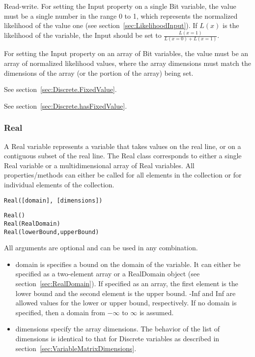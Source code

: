 Read-write.  For setting the Input property on a single Bit variable, the value must be a single number in the range 0 to 1, which represents the normalized likelihood of the value one (see section~\ref{sec:LikelihoodInput}).  If $L(x)$ is the likelihood of the variable, the Input should be set to $\frac{L(x=1)}{L(x=0) + L(x=1)}$.

For setting the Input property on an array of Bit variables, the value must be an array of normalized likelihood values, where the array dimensions must match the dimensions of the array (or the portion of the array) being set.



See section~\ref{sec:Discrete.FixedValue}.



See section~\ref{sec:Discrete.hasFixedValue}.


\subsubsection{Real}

A Real variable represents a variable that takes values on the real line, or on a contiguous subset of the real line.  \ifmatlab The Real class corresponds to either a single Real variable or a multidimensional array of Real variables.  All properties/methods can either be called for all elements in the collection or for individual elements of the collection.  \fi


\ifmatlab
\begin{lstlisting}
Real([domain], [dimensions])
\end{lstlisting}
\fi

\ifjava
\begin{lstlisting}
Real()
Real(RealDomain)
Real(lowerBound,upperBound)
\end{lstlisting}
\fi

\ifmatlab
All arguments are optional and can be used in any combination.

\begin{itemize}
\item domain is specifies a bound on the domain of the variable. It can either be specified as a two-element array or a RealDomain object (see section~\ref{sec:RealDomain}).  If specified as an array, the first element is the lower bound and the second element is the upper bound. -Inf and Inf are allowed values for the lower or upper bound, respectively.  If no domain is specified, then a domain from $-\infty$ to $\infty$ is assumed.
\item dimensions specify the array dimensions.  The behavior of the list of dimensions is identical to that for Discrete variables as described in section~\ref{sec:VariableMatrixDimensions}.
\end{itemize}
\fi

